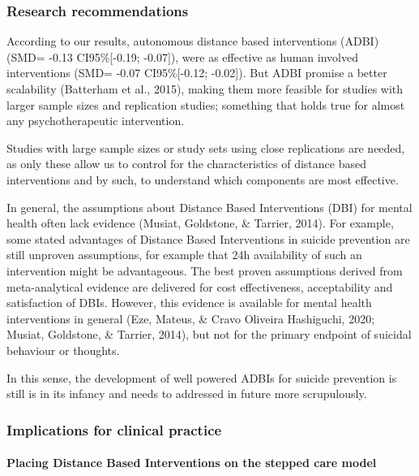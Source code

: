 \documentclass[
  english,
  man]{apa6}
\let\oldparagraph\paragraph
\renewcommand{\paragraph}[1]{\oldparagraph{#1}\mbox{}}
\begin{document}
\hypertarget{research-recommendations}{%
\subsubsection{Research recommendations}\label{research-recommendations}}

According to our results, autonomous distance based interventions (ADBI) (SMD= -0.13 CI95\%{[}-0.19; -0.07{]}), were as effective as human involved interventions (SMD= -0.07 CI95\%{[}-0.12; -0.02{]}). But ADBI promise a better scalability (Batterham et al., 2015), making them more feasible for studies with larger sample sizes and replication studies; something that holds true for almost any psychotherapeutic intervention.

Studies with large sample sizes or study sets using close replications are needed, as only these allow us to control for the characteristics of distance based interventions and by such, to understand which components are most effective.

In general, the assumptions about Distance Based Interventions (DBI) for mental health often lack evidence (Musiat, Goldstone, \& Tarrier, 2014). For example, some stated advantages of Distance Based Interventions in suicide prevention are still unproven assumptions, for example that 24h availability of such an intervention might be advantageous. The best proven assumptions derived from meta-analytical evidence are delivered for cost effectiveness, acceptability and satisfaction of DBIs. However, this evidence is available for mental health interventions in general (Eze, Mateus, \& Cravo Oliveira Hashiguchi, 2020; Musiat, Goldstone, \& Tarrier, 2014), but not for the primary endpoint of suicidal behaviour or thoughts.

In this sense, the development of well powered ADBIs for suicide prevention is still is in its infancy and needs to addressed in future more scrupulously.

\hypertarget{implications-for-clinical-practice}{%
\subsubsection{Implications for clinical practice}\label{implications-for-clinical-practice}}

\hypertarget{placing-distance-based-interventions-on-the-stepped-care-model}{%
\paragraph{Placing Distance Based Interventions on the stepped care model}\label{placing-distance-based-interventions-on-the-stepped-care-model}}
\end{document}
